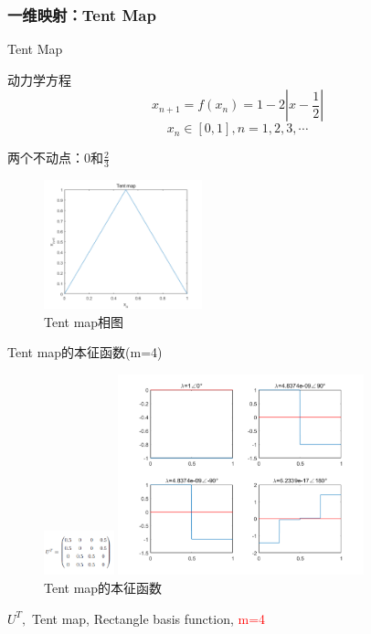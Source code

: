 \documentclass{beamer}
\begin{document}
		\subsubsection{一维映射：Tent Map}
		\begin{frame}{Tent Map}
		\begin{block}{动力学方程}
			$$x_{n+1}=f(x_n)=1-2|x-\frac{1}{2}|$$
			$$x_n\in [0,1], n=1,2,3,\cdots$$
		\end{block}
		两个不动点：0和$\frac{2}{3}$
		\begin{figure}
			\begin{minipage}{0.4\linewidth}
				\centering
				\includegraphics[width=1.8in]{figure/tent_phase}
				\caption{Tent map相图}
			\end{minipage}
		\end{figure}
		\end{frame}
\begin{frame}{Tent map的本征函数(m=4)}
	\begin{figure}
		\begin{minipage}{0.2\linewidth}
			\centering
			\includegraphics[width=0.8in]{figure/tent_m4_matrix}
			\caption{Koopman算符的矩阵表示(m=4)}
		\end{minipage}
		\begin{minipage}{0.6\linewidth}
			\centering
			\includegraphics[width=2.8in]{figure/tent_m4_eigen}
			\caption{Tent map的本征函数}
		\end{minipage}
	\end{figure}
	\centering
	$U^T,$ Tent map, Rectangle basis function, \textcolor{red}{m=4}
\end{frame}
\end{document}
